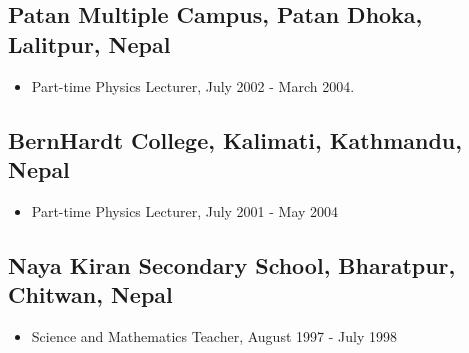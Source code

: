 \documentclass[10pt, letterpaper]{article}
\begin{document}
\subsection*{Patan Multiple Campus, Patan Dhoka, Lalitpur, Nepal}
\begin{itemize}
\item Part-time Physics Lecturer, July 2002 - March 2004.
\end{itemize}

\subsection*{BernHardt College, Kalimati, Kathmandu, Nepal}
\begin{itemize}
\item Part-time Physics Lecturer, July 2001 - May 2004
\end{itemize}

\subsection*{Naya Kiran Secondary School, Bharatpur, Chitwan, Nepal}
\begin{itemize}
\item Science and Mathematics Teacher, August 1997 - July 1998
\end{itemize}
\end{document}
